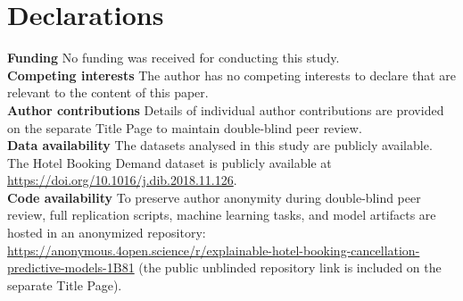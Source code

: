 \documentclass[pdflatex,iicol,sn-mathphys-ay]{sn-jnl}
\theoremstyle{thmstyleone}%
\theoremstyle{thmstyletwo}%
\theoremstyle{thmstylethree}%
\begin{document}
\backmatter

\section*{Declarations}

\textbf{Funding} No funding was received for conducting this study.\\

\noindent \textbf{Competing interests} The author has no competing interests to declare that are relevant to the content of this paper.\\

\noindent \textbf{Author contributions} Details of individual author contributions are provided on the separate Title Page to maintain double-blind peer review.\\

\noindent \textbf{Data availability} The datasets analysed in this study are publicly available. The Hotel Booking Demand dataset is publicly available at \url{https://doi.org/10.1016/j.dib.2018.11.126}.\\

\noindent \textbf{Code availability} To preserve author anonymity during double-blind peer review, full replication scripts, machine learning tasks, and model artifacts are hosted in an anonymized repository: \url{https://anonymous.4open.science/r/explainable-hotel-booking-cancellation-predictive-models-1B81} (the public unblinded repository link is included on the separate Title Page).


\end{document}

